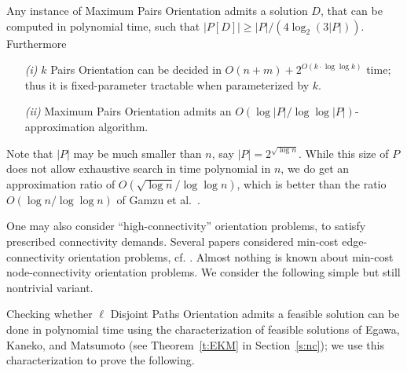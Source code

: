 \documentclass[envcountsame]{llncs}
\begin{document}
\begin{theorem} \label{t:kernel}
Any instance of {\sf Maximum Pairs Orientation} 
admits a solution $D$, that can be computed in polynomial time, such that $|P[D]| \geq |P|/(4\log_2 (3|P|))$.
Furthermore
\begin{itemize}
\item[{\em (i)}]
{\sf $k$ Pairs Orientation} can be decided in $O(n+m)+2^{O(k\cdot \log \log k)}$ time;
thus it is fixed-parameter tractable when parameterized by $k$.
\item[{\em (ii)}]
{\sf Maximum Pairs Orientation} admits an $O(\log |P|/\log\log |P|)$-approximation algorithm.
\end{itemize}
\end{theorem} 

Note that $|P|$ may be much smaller than $n$, say $|P|=2^{\sqrt{\log n}}$.
While this size of $P$ does not allow exhaustive search in time 
polynomial in $n$, we do get an approximation ratio of 
$O(\sqrt{\log n}/\log\log n)$, 
which is better than the ratio $O(\log n/\log\log n)$ of Gamzu et al.~\cite{segev-approx}.

One may also consider ``high-connectivity'' orientation problems,
to satisfy prescribed connectivity demands.
Several papers considered min-cost edge-connectivity orientation problems, cf. \cite{KNS}.
Almost nothing is known about min-cost node-connectivity orientation problems.
We consider the following simple but still nontrivial variant.

\vspace{0.1cm}

\begin{center} 
\end{center}

\vspace{0.1cm}

Checking whether {\sf $\ell$ Disjoint Paths Orientation} admits a feasible solution can 
be done in polynomial time using the characterization of feasible solutions of 
Egawa, Kaneko, and Matsumoto \cite{EKM} (see Theorem~\ref{t:EKM} in Section~\ref{s:nc});
we use this characterization to prove the following.
\end{document}
